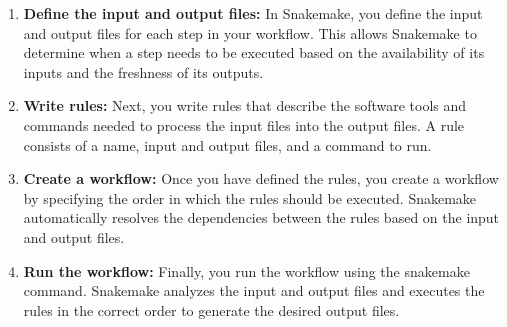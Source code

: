 \documentclass[
]{book}
\providecommand{\tightlist}{%
  \setlength{\itemsep}{0pt}\setlength{\parskip}{0pt}}
\begin{document}
\begin{enumerate}
\def\labelenumi{\arabic{enumi}.}
\tightlist
\item
  \textbf{Define the input and output files:} In Snakemake, you define the input and output files for each step in your workflow. This allows Snakemake to determine when a step needs to be executed based on the availability of its inputs and the freshness of its outputs.
\item
  \textbf{Write rules:} Next, you write rules that describe the software tools and commands needed to process the input files into the output files. A rule consists of a name, input and output files, and a command to run.
\item
  \textbf{Create a workflow:} Once you have defined the rules, you create a workflow by specifying the order in which the rules should be executed. Snakemake automatically resolves the dependencies between the rules based on the input and output files.
\item
  \textbf{Run the workflow:} Finally, you run the workflow using the snakemake command. Snakemake analyzes the input and output files and executes the rules in the correct order to generate the desired output files.
\end{enumerate}

\small
\end{document}
